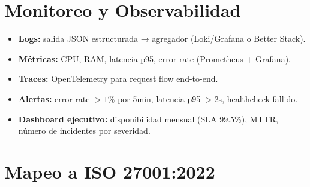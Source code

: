 \documentclass[12pt,a4paper,oneside]{article}
\begin{document}
\section{Monitoreo y Observabilidad}

\begin{itemize}[leftmargin=*]
  \item \textbf{Logs:} salida JSON estructurada → agregador (Loki/Grafana o Better Stack).
  \item \textbf{Métricas:} CPU, RAM, latencia p95, error rate (Prometheus + Grafana).
  \item \textbf{Traces:} OpenTelemetry para request flow end-to-end.
  \item \textbf{Alertas:} error rate $> 1\%$ por 5min, latencia p95 $> 2$s, healthcheck fallido.
  \item \textbf{Dashboard ejecutivo:} disponibilidad mensual (SLA 99.5\%), MTTR, número de incidentes por severidad.
\end{itemize}

\section{Mapeo a ISO 27001:2022}
\end{document}
